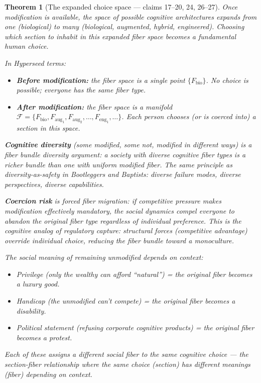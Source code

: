 \documentclass[11pt,a4paper]{article}
\newtheorem{theorem}[definition]{Theorem}
\begin{document}
\begin{theorem}[The expanded choice space --- claims 17--20, 24, 26--27]
\label{thm:choice}
Once modification is available, the space of possible cognitive
architectures expands from one (biological) to many (biological,
augmented, hybrid, engineered). Choosing which section to inhabit
in this expanded fiber space becomes a fundamental human choice.

In Hyperseed terms:
\begin{itemize}
\item \textbf{Before modification:} the fiber space is a single point
  $\{F_{\text{bio}}\}$. No choice is possible; everyone has the
  same fiber type.
\item \textbf{After modification:} the fiber space is a manifold
  $\mathcal{F} = \{F_{\text{bio}}, F_{\text{aug}_1}, F_{\text{aug}_2},
  \ldots, F_{\text{eng}_1}, \ldots\}$. Each person chooses (or is
  coerced into) a section in this space.
\end{itemize}

\textbf{Cognitive diversity} (some modified, some not, modified in
different ways) is a \emph{fiber bundle diversity} argument: a society
with diverse cognitive fiber types is a richer bundle than one with
uniform modified fiber. The same principle as diversity-as-safety in
Bootleggers and Baptists: diverse failure modes, diverse perspectives,
diverse capabilities.

\textbf{Coercion risk} is \emph{forced fiber migration}: if competitive
pressure makes modification effectively mandatory, the social dynamics
compel everyone to abandon the original fiber type regardless of
individual preference. This is the cognitive analog of regulatory capture:
structural forces (competitive advantage) override individual choice,
reducing the fiber bundle toward a monoculture.

The social meaning of remaining unmodified depends on context:
\begin{itemize}
\item Privilege (only the wealthy can afford ``natural'') = the original
  fiber becomes a luxury good.
\item Handicap (the unmodified can't compete) = the original fiber
  becomes a disability.
\item Political statement (refusing corporate cognitive products) = the
  original fiber becomes a protest.
\end{itemize}

Each of these assigns a different social fiber to the same cognitive
choice --- the section-fiber relationship where the same choice (section)
has different meanings (fiber) depending on context.
\end{theorem}
\end{document}
